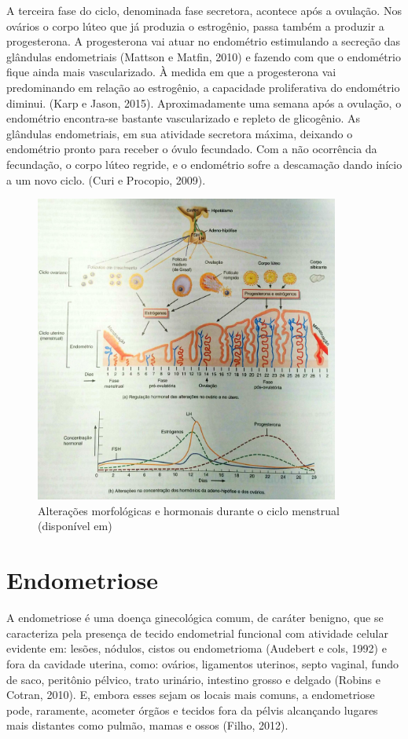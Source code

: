 \documentclass[12pt]{article} %
\begin{document}
A terceira fase do ciclo, denominada fase secretora, acontece após a ovulação. Nos ovários
o corpo lúteo que já produzia o estrogênio, passa também a produzir a progesterona.
A progesterona vai atuar no endométrio estimulando a
secreção das glândulas endometriais (Mattson e Matfin, 2010) e fazendo com que o
endométrio fique ainda mais vascularizado. À medida em que a
progesterona vai predominando em relação ao estrogênio, a capacidade
proliferativa do endométrio diminui. (Karp e Jason, 2015).
Aproximadamente uma semana após a ovulação, o endométrio encontra-se
bastante vascularizado e repleto de glicogênio. As glândulas
endometriais, em sua atividade secretora máxima, deixando o endométrio  %
pronto para receber o óvulo fecundado. Com a não ocorrência da
fecundação, o corpo lúteo regride, e o endométrio sofre a descamação
dando início a um novo ciclo.  (Curi e Procopio, 2009).


\begin{figure}[h!]
\centering
\includegraphics[width=10cm]{ciclo.jpg}
\caption[Alterações morfológicas e hormonais durante o ciclo menstrual]{ Alterações morfológicas e hormonais durante o ciclo menstrual (disponível em) } 
\label{ciclo menstrual}
\end{figure} 

\section{Endometriose}

A endometriose é uma doença ginecológica comum, de caráter benigno,
que se caracteriza pela presença de tecido endometrial funcional com
atividade celular evidente em: lesões, nódulos, cistos ou
endometrioma (Audebert e cols, 1992) e fora da cavidade uterina, como:
ovários, ligamentos uterinos, septo vaginal, fundo de saco, peritônio
pélvico, trato urinário, intestino grosso e delgado (Robins e Cotran, 2010). E, embora
esses sejam os locais mais comuns, a endometriose pode, raramente,
acometer órgãos e tecidos fora da pélvis alcançando lugares mais distantes 
 como pulmão, mamas e ossos (Filho,
2012).  %
\end{document}
